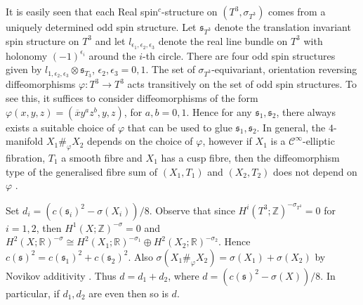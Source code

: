 \documentclass{amsart}
\theoremstyle{definition}
\theoremstyle{remark}
\numberwithin{equation}{section}
\begin{document}
It is easily seen that each Real spin$^c$-structure on $(T^3 , \sigma_{T^3})$ comes from a uniquely determined odd spin structure. Let $\mathfrak{s}_{T^3}$ denote the translation invariant spin structure on $T^3$ and let $l_{\epsilon_1 , \epsilon_2, \epsilon_3}$ denote the real line bundle on $T^3$ with holonomy $(-1)^{\epsilon_i}$ around the $i$-th circle. There are four odd spin structures given by $l_{1 , \epsilon_2, \epsilon_3} \otimes \mathfrak{s}_{T_3}$, $\epsilon_2,\epsilon_3 = 0,1$. The set of $\sigma_{T^3}$-equivariant, orientation reversing diffeomorphisms $\varphi : T^3 \to T^3$ acts transitively on the set of odd spin structures. To see this, it suffices to consider diffeomorphisms of the form $\varphi(x,y,z) = (\overline{x}y^a z^b  , y , z)$, for $a,b = 0,1$. Hence for any $\mathfrak{s}_1,\mathfrak{s}_2$, there always exists a suitable choice of $\varphi$ that can be used to glue $\mathfrak{s}_1, \mathfrak{s}_2$. In general, the $4$-manifold $X_1 \#_\varphi X_2$ depends on the choice of $\varphi$, however if $X_1$ is a $\mathcal{C}^\infty$-elliptic fibration, $T_1$ a smooth fibre and $X_1$ has a cusp fibre, then the diffeomorphism type of the generalised fibre sum of $(X_1 , T_1)$ and $(X_2 , T_2)$ does not depend on $\varphi$ \cite[Lemma 8.3.6]{gs}.

Set $d_i = (c(\mathfrak{s}_i)^2 - \sigma(X_i) )/8$. Observe that since $H^i( T^3 ; \mathbb{Z} )^{-\sigma_{T^3}} = 0$ for $i=1,2$, then $H^1( X ; \mathbb{Z} ) ^{-\sigma} = 0$ and $H^2(X ; \mathbb{R})^{-\sigma} \cong H^2(X_1 ; \mathbb{R})^{-\sigma_1} \oplus H^2(X_2 ; \mathbb{R})^{-\sigma_2}$. Hence $c(\mathfrak{s})^2 = c(\mathfrak{s}_1)^2 + c(\mathfrak{s}_2)^2$. Also $\sigma(X_1 \#_\varphi X_2 ) = \sigma(X_1) + \sigma(X_2)$ by Novikov additivity \cite[Remark 9.1.7]{gs}. Thus $d = d_1 + d_2$, where $d = (c(\mathfrak{s})^2 - \sigma(X))/8$. In particular, if $d_1,d_2$ are even then so is $d$.
\end{document}
